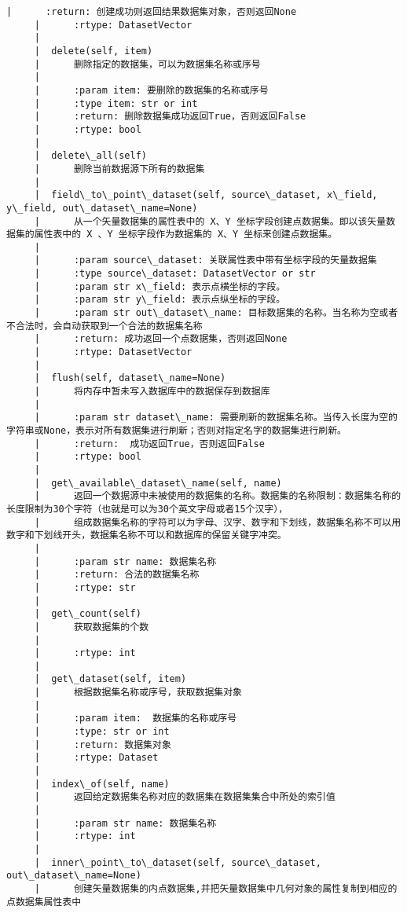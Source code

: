 \documentclass[11pt]{article}
\begin{document}
\begin{Verbatim}[commandchars=\\\{\}]
     |      :return: 创建成功则返回结果数据集对象，否则返回None
     |      :rtype: DatasetVector
     |  
     |  delete(self, item)
     |      删除指定的数据集，可以为数据集名称或序号
     |      
     |      :param item: 要删除的数据集的名称或序号
     |      :type item: str or int
     |      :return: 删除数据集成功返回True，否则返回False
     |      :rtype: bool
     |  
     |  delete\_all(self)
     |      删除当前数据源下所有的数据集
     |  
     |  field\_to\_point\_dataset(self, source\_dataset, x\_field, y\_field, out\_dataset\_name=None)
     |      从一个矢量数据集的属性表中的 X、Y 坐标字段创建点数据集。即以该矢量数据集的属性表中的 X 、Y 坐标字段作为数据集的 X、Y 坐标来创建点数据集。
     |      
     |      :param source\_dataset: 关联属性表中带有坐标字段的矢量数据集
     |      :type source\_dataset: DatasetVector or str
     |      :param str x\_field: 表示点横坐标的字段。
     |      :param str y\_field: 表示点纵坐标的字段。
     |      :param str out\_dataset\_name: 目标数据集的名称。当名称为空或者不合法时，会自动获取到一个合法的数据集名称
     |      :return: 成功返回一个点数据集，否则返回None
     |      :rtype: DatasetVector
     |  
     |  flush(self, dataset\_name=None)
     |      将内存中暂未写入数据库中的数据保存到数据库
     |      
     |      :param str dataset\_name: 需要刷新的数据集名称。当传入长度为空的字符串或None，表示对所有数据集进行刷新；否则对指定名字的数据集进行刷新。
     |      :return:  成功返回True，否则返回False
     |      :rtype: bool
     |  
     |  get\_available\_dataset\_name(self, name)
     |      返回一个数据源中未被使用的数据集的名称。数据集的名称限制：数据集名称的长度限制为30个字符（也就是可以为30个英文字母或者15个汉字），
     |      组成数据集名称的字符可以为字母、汉字、数字和下划线，数据集名称不可以用数字和下划线开头，数据集名称不可以和数据库的保留关键字冲突。
     |      
     |      :param str name: 数据集名称
     |      :return: 合法的数据集名称
     |      :rtype: str
     |  
     |  get\_count(self)
     |      获取数据集的个数
     |      
     |      :rtype: int
     |  
     |  get\_dataset(self, item)
     |      根据数据集名称或序号，获取数据集对象
     |      
     |      :param item:  数据集的名称或序号
     |      :type: str or int
     |      :return: 数据集对象
     |      :rtype: Dataset
     |  
     |  index\_of(self, name)
     |      返回给定数据集名称对应的数据集在数据集集合中所处的索引值
     |      
     |      :param str name: 数据集名称
     |      :rtype: int
     |  
     |  inner\_point\_to\_dataset(self, source\_dataset, out\_dataset\_name=None)
     |      创建矢量数据集的内点数据集,并把矢量数据集中几何对象的属性复制到相应的点数据集属性表中

\end{Verbatim}
\end{document}
